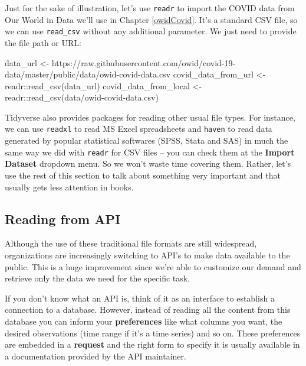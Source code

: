 \documentclass[
]{book}
\newenvironment{Shaded}{\begin{snugshade}}{\end{snugshade}}
\newcommand{\FunctionTok}[1]{\textcolor[rgb]{0.00,0.00,0.00}{#1}}
\newcommand{\NormalTok}[1]{#1}
\newcommand{\OtherTok}[1]{\textcolor[rgb]{0.56,0.35,0.01}{#1}}
\newcommand{\SpecialCharTok}[1]{\textcolor[rgb]{0.00,0.00,0.00}{#1}}
\newcommand{\StringTok}[1]{\textcolor[rgb]{0.31,0.60,0.02}{#1}}
\begin{document}
Just for the sake of illustration, let's use \texttt{readr} to import the COVID data from Our World in Data we'll use in Chapter \ref{owidCovid}. It's a standard CSV file, so we can use \texttt{read\_csv} without any additional parameter. We just need to provide the file path or URL:

\begin{Shaded}
\begin{Highlighting}[]
\NormalTok{data\_url }\OtherTok{\textless{}{-}} \StringTok{\textquotesingle{}https://raw.githubusercontent.com/owid/covid{-}19{-}data/master/public/data/owid{-}covid{-}data.csv\textquotesingle{}}
\NormalTok{covid\_data\_from\_url   }\OtherTok{\textless{}{-}}\NormalTok{ readr}\SpecialCharTok{::}\FunctionTok{read\_csv}\NormalTok{(data\_url)}
\NormalTok{covid\_data\_from\_local }\OtherTok{\textless{}{-}}\NormalTok{ readr}\SpecialCharTok{::}\FunctionTok{read\_csv}\NormalTok{(}\StringTok{\textquotesingle{}data/owid{-}covid{-}data.csv\textquotesingle{}}\NormalTok{)}
\end{Highlighting}
\end{Shaded}

Tidyverse also provides packages for reading other usual file types. For instance, we can use \texttt{readxl} to read MS Excel spreadsheets and \texttt{haven} to read data generated by popular statistical softwares (SPSS, Stata and SAS) in much the same way we did with \texttt{readr} for CSV files -- you can check them at the \textbf{Import Dataset} dropdown menu. So we won't waste time covering them. Rather, let's use the rest of this section to talk about something very important and that usually gets less attention in books.

\hypertarget{reading-from-api}{%
\subsection{Reading from API}\label{reading-from-api}}

Although the use of these traditional file formats are still widespread, organizations are increasingly switching to API's to make data available to the public. This is a huge improvement since we're able to customize our demand and retrieve only the data we need for the specific task.

If you don't know what an API is, think of it as an interface to establish a connection to a database. However, instead of reading all the content from this database you can inform your \textbf{preferences} like what columns you want, the desired observations (time range if it's a time series) and so on. These preferences are embedded in a \textbf{request} and the right form to specify it is usually available in a documentation provided by the API maintainer.
\end{document}
